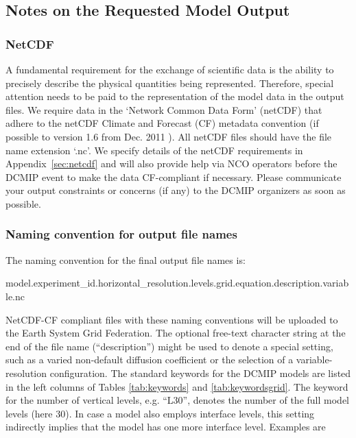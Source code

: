 \documentclass[times,doublespace]{fldauth}
\begin{document}
\subsection{Notes on the Requested Model Output}
\label{sec:notes_output}
\subsubsection{NetCDF}
A fundamental requirement for the exchange of scientific data is the ability to  precisely describe the physical quantities being represented. Therefore, special attention needs to be paid to the representation of the model data in the output files. We require data in the `Network Common Data Form' (netCDF) \cite{netcdf} that adhere to the netCDF Climate and Forecast (CF) metadata convention (if possible to version 1.6 from Dec. 2011 \cite{netcdf-cf}). All netCDF files should have the file name extension `.nc'.
We specify details of the netCDF requirements in Appendix~\ref{sec:netcdf} and will also provide help via NCO operators before the DCMIP event to make the data CF-compliant if necessary. Please communicate your output constraints or concerns (if any) to the DCMIP organizers as soon as possible.

\subsubsection{Naming convention for output file names}
The naming convention for the final output file names is:
\vspace{0.2cm}

\noindent
model.experiment\_id.horizontal\_resolution.levels.grid.equation.description.variable.nc

\vspace{0.2cm}
\noindent
NetCDF-CF compliant files with these naming conventions will be uploaded to the Earth System Grid Federation.
The optional free-text character string at the end of the file name (``description'') might be used to denote a special setting, such as a varied non-default diffusion coefficient or the selection of a variable-resolution configuration.
The standard keywords for the DCMIP models are listed in the left columns of Tables \ref{tab:keywords} and \ref{tab:keywordsgrid}. The keyword for the number of vertical levels, e.g. ``L30'', denotes the number of the full model levels (here 30). In case a model also employs interface levels, this setting indirectly implies that the model has one more interface level. Examples are \\
\vspace{0.0cm}
\end{document}
